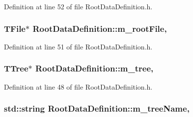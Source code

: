 Definition at line 52 of file Root\+Data\+Definition.\+h.

\hypertarget{classRootDataDefinition_af00a892a1b940abf9265066391b67304}{
\subsubsection[{m\+\_\+root\+File}]{\setlength{\rightskip}{0pt plus 5cm}T\+File$\ast$ Root\+Data\+Definition\+::m\+\_\+root\+File\hspace{0.3cm}{\ttfamily [protected]}, {\ttfamily [inherited]}}}\label{classRootDataDefinition_af00a892a1b940abf9265066391b67304}


Definition at line 51 of file Root\+Data\+Definition.\+h.

\hypertarget{classRootDataDefinition_a941ec585a2aa533bc30889a382e54f50}{
\subsubsection[{m\+\_\+tree}]{\setlength{\rightskip}{0pt plus 5cm}T\+Tree$\ast$ Root\+Data\+Definition\+::m\+\_\+tree\hspace{0.3cm}{\ttfamily [protected]}, {\ttfamily [inherited]}}}\label{classRootDataDefinition_a941ec585a2aa533bc30889a382e54f50}


Definition at line 48 of file Root\+Data\+Definition.\+h.

\hypertarget{classRootDataDefinition_a46394bbb1863baa4abcd8cbd0413fa88}{
\subsubsection[{m\+\_\+tree\+Name}]{\setlength{\rightskip}{0pt plus 5cm}std\+::string Root\+Data\+Definition\+::m\+\_\+tree\+Name\hspace{0.3cm}{\ttfamily [protected]}, {\ttfamily [inherited]}}}\label{classRootDataDefinition_a46394bbb1863baa4abcd8cbd0413fa88}


